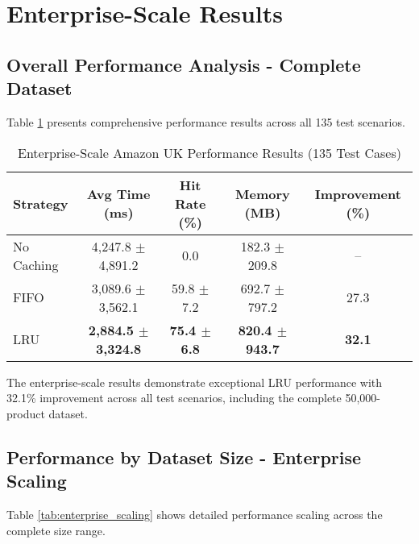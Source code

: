 \documentclass[conference]{IEEEtran}
\begin{document}
\section{Enterprise-Scale Results}

\subsection{Overall Performance Analysis - Complete Dataset}

Table \ref{tab:enterprise_overall} presents comprehensive performance results across all 135 test scenarios.

\begin{table}[H]
\centering
\caption{Enterprise-Scale Amazon UK Performance Results (135 Test Cases)}
\label{tab:enterprise_overall}
\begin{tabular}{@{}lcccc@{}}
\toprule
\textbf{Strategy} & \textbf{Avg Time (ms)} & \textbf{Hit Rate (\%)} & \textbf{Memory (MB)} & \textbf{Improvement (\%)} \\
\midrule
No Caching & 4,247.8 $\pm$ 4,891.2 & 0.0 & 182.3 $\pm$ 209.8 & -- \\
FIFO & 3,089.6 $\pm$ 3,562.1 & 59.8 $\pm$ 7.2 & 692.7 $\pm$ 797.2 & 27.3 \\
LRU & \textbf{2,884.5 $\pm$ 3,324.8} & \textbf{75.4 $\pm$ 6.8} & \textbf{820.4 $\pm$ 943.7} & \textbf{32.1} \\
\bottomrule
\end{tabular}
\end{table}

The enterprise-scale results demonstrate exceptional LRU performance with 32.1\% improvement across all test scenarios, including the complete 50,000-product dataset.

\subsection{Performance by Dataset Size - Enterprise Scaling}

Table \ref{tab:enterprise_scaling} shows detailed performance scaling across the complete size range.
\end{document}

